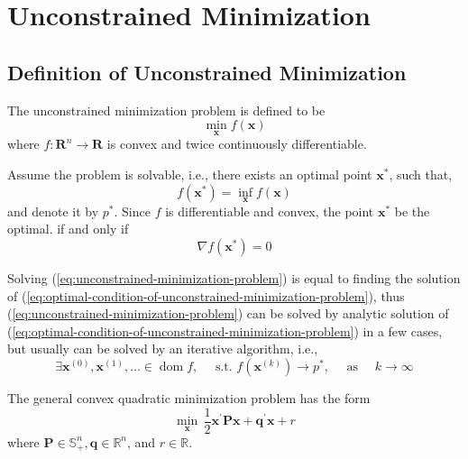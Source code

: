 \chapter{Unconstrained Minimization}

\section{Definition of Unconstrained Minimization}

\begin{definition}
    The unconstrained minimization problem is defined to be
    \begin{equation}
        \min_{\mathbf{x}}f(\mathbf{x})
        \label{eq:unconstrained-minimization-problem}
    \end{equation}
    where $f:\mathbf{R}^n\rightarrow\mathbf{R}$ is convex and twice continuously differentiable.
\end{definition}

Assume the problem is solvable, i.e., there exists an optimal point $\mathbf{x}^{*}$, such that,
\begin{equation*}
    f(\mathbf{x}^{*})=\inf_{\mathbf{x}}f(\mathbf{x})
\end{equation*}
and denote it by $p^{*}$. Since $f$ is differentiable and convex, the point $\mathbf{x}^{*}$ be the optimal. if and only if
\begin{equation}
    \nabla f(\mathbf{x}^{*})=0
    \label{eq:optimal-condition-of-unconstrained-minimization-problem}
\end{equation}

Solving (\ref{eq:unconstrained-minimization-problem}) is equal to finding the solution of (\ref{eq:optimal-condition-of-unconstrained-minimization-problem}), thus (\ref{eq:unconstrained-minimization-problem}) can be solved by analytic solution of (\ref{eq:optimal-condition-of-unconstrained-minimization-problem}) in a few cases, but usually can be solved by an iterative algorithm, i.e.,
\begin{equation*}
    \exists\mathbf{x}^{(0)},\mathbf{x}^{(1)},\ldots\in\operatorname{dom}f,\quad\text{ s.t. }f\left(\mathbf{x}^{(k)}\right)\rightarrow p^{*},\quad\text{ as }\quad k\rightarrow\infty
\end{equation*}

\begin{example}
    The general convex quadratic minimization problem has the form
    \begin{equation}
        \min_{\mathbf{x}}\,\frac{1}{2}\mathbf{x}^{\prime}\mathbf{P}\mathbf{x}+\mathbf{q}^{\prime}\mathbf{x}+r \label{eq:quadratic-minimization}
    \end{equation}
    where $\mathbf{P}\in\mathbb{S}_{+}^{n},\mathbf{q}\in\mathbb{R}^{n}$, and $r\in\mathbb{R}$.
\end{example}

